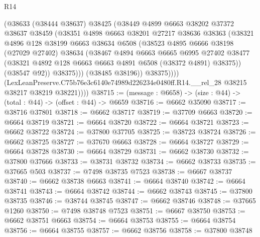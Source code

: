 \begin{lexlean}{R14}
\begin{coremodule}
                  (@38633
                    (@38444 @38637)
                    @38425
                    (@38449
                      @4899
                      @6663
                      @38202
                      @37372
                      @38637
                      @38459
                      (@38351
                        @4898
                        @6663
                        @38201
                        @27217
                        @38636
                        @38363
                        (@38321
                          @4896
                          @128
                          @38199
                          @6663
                          @38634
                          @6508
                          (@38523
                            @4895
                            @6666
                            @38198
                            (@27029 @27402)
                            @38634
                            (@38467
                              @4894
                              @6663
                              @6665
                              @6995
                              @27402
                              @38477
                              (@38321 @4892 @128 @6663 @6663 @4891 @6508 (@38372 @4891) @38375))
                            (@38547 @92))
                          @38375)))
                    (@38485 @38196))
                  @38375))))
          (LexLeanPreserve.C75b76e3c6140e74989d226234e0480ff.R14.__rel_28
            @38215
            @38217
            @38219
            @38221))))
@38715 := (message : @6658) -> (size : @44) -> (total : @44) -> (offset : @44) -> @6659
@38716 := @6662 @35090
@38717 := @38716 @37801
@38718 := @6662 @38717
@38719 := @37709 @6663
@38720 := @6664 @38719
@38721 := @6664 @38720
@38722 := @6664 @38721
@38723 := @6662 @38722
@38724 := @37800 @37705
@38725 := @38723 @38724
@38726 := @6662 @38725
@38727 := @37670 @6663
@38728 := @6664 @38727
@38729 := @6664 @38728
@38730 := @6664 @38729
@38731 := @6662 @38730
@38732 := @37800 @37666
@38733 := @38731 @38732
@38734 := @6662 @38733
@38735 := @37665 @503
@38737 := @7498 @38735 @7523
@38738 := @6667 @38737
@38740 := @6662 @38738 @6663
@38741 := @6664 @38740
@38742 := @6664 @38741
@38743 := @6664 @38742
@38744 := @6662 @38743
@38745 := @37800 @38735
@38746 := @38744 @38745
@38747 := @6662 @38746
@38748 := @37665 @1260
@38750 := @7498 @38748 @7523
@38751 := @6667 @38750
@38753 := @6662 @38751 @6663
@38754 := @6664 @38753
@38755 := @6664 @38754
@38756 := @6664 @38755
@38757 := @6662 @38756
@38758 := @37800 @38748

\end{coremodule}
\end{lexlean}
